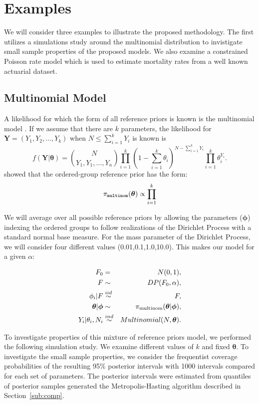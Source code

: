 \documentclass[11pt,a4paper,notitlepage]{article}
\begin{document}
\section{Examples}\label{sec:examples}
We will consider three examples to illustrate the proposed methodology.
The first utilizes a simulations study around the multinomial
distribution to invistigate small sample properties of the proposed
models.  We also examine a constrained Poisson rate model which is
used to estimate mortality rates from a well known actuarial dataset. 

\subsection{Multinomial Model}
A likelihood for which the form of all reference priors is known is the
multinomial model \citep{BergerBernardo1992b}.  If we assume that there are
$k$ parameters, the likelihood for $\boldsymbol{Y} = (Y_1, Y_2,\ldots, Y_k)$ when $N\le\sum_{i=1}^kY_i$ is known
is
\[
f(\boldsymbol{Y}|\boldsymbol{\theta}) = {N \choose Y_1,Y_1,\ldots, Y_n}\prod_{i=1}^k\left(1-\sum_{i=1}^k\theta_i\right)^{N-\sum_{i=1}^kY_i}\prod_{i=1}^k\theta_i^{Y_i}.
\]
\cite{BergerBernardo1992b} showed that the ordered-group reference prior has the form: 
\[
\pi_{\tt multinom}(\boldsymbol{\theta}) \propto \prod_{i=1}^{k}
\]

We will average over all possible reference priors by allowing the
parameters ($\boldsymbol{\phi}$) indexing the ordered groups to follow
realizations of the Dirichlet Process with a standard normal base
measure.  For the mass parameter of the Dirichlet Process, we will
consider four different values (0.01,0.1,1.0,10.0).  This makes our
model for a given $\alpha$:

\begin{eqnarray*}
  F_0 &=& N(0,1),\\
  F &\sim& DP(F_0, \alpha),\\
  \phi_i|F &\stackrel{iid}{\sim}& F,\\
  \boldsymbol{\theta}|\boldsymbol{\phi} &\sim&  
  \pi_{\rm multinom}(\boldsymbol{\theta}|\boldsymbol{\phi}), \\
  Y_i | \theta_i, N_i &\stackrel{ind}{\sim}& Multinomial(N,\boldsymbol{\theta}).
\end{eqnarray*}

To investigate properties of this mixture of reference priors model,
we performed the following simulation study.  We examine different
values of $k$ and fixed $\boldsymbol{\theta}$.  To investigate the
small sample properties, we consider the frequentist coverage
probabilities of the resulting 95\% posterior intervals with 1000
intervals compared for each set of parameters.  The posterior
intervals were estimated from quantiles of posterior samples generated
the Metropolis-Hasting algorithm described in Section~\ref{sub:comp}.
\end{document}
